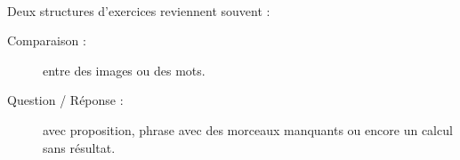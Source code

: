 \paragraph{}Deux structures d'exercices reviennent souvent :
\begin{description}
\item[Comparaison : ] entre des images ou des mots.
\item[Question / Réponse : ] avec proposition, phrase avec des morceaux manquants ou encore un calcul sans résultat.
\end{description}
